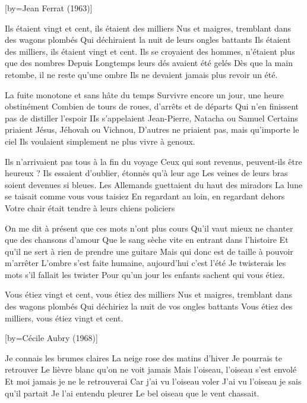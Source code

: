 [by={Jean Ferrat (1963)}]

\beginverse
Ils étaient vingt et cent, ils étaient des milliers
Nus et maigres, tremblant dans des wagons plombés
Qui déchiraient la nuit de leurs ongles battants
Ils étaient des milliers, ils étaient vingt et cent.
Ils se croyaient des hommes, n'étaient plus que des nombres
Depuis Longtemps leurs dés avaient été gelés
Dès que la main retombe, il ne reste qu'une ombre
Ils ne devaient jamais plus revoir un été.
\endverse

\beginverse
La fuite monotone et sans hâte du temps
Survivre encore un jour, une heure obstinément
Combien de tours de roues, d'arrêts et de départs
Qui n'en finissent pas de distiller l'espoir
IIs s'appelaient Jean-Pierre, Natacha ou Samuel
Certains priaient Jésus, Jéhovah ou Vichnou,
D'autres ne priaient pas, mais qu'importe le ciel
Ils voulaient simplement ne plus vivre à genoux.
\endverse

\beginverse
Ils n'arrivaient pas tous à la fin du voyage
Ceux qui sont revenus, peuvent-ils être heureux ?
Ils essaient d'oublier, étonnės qu'à leur age
Les veines de leurs bras soient devenues si bleues.
Les Allemands guettaient du haut des miradors
La lune se taisait comme vous vous taisiez
En regardant au loin, en regardant dehors
Votre chair était tendre à leurs chiens policiers
\endverse

\beginverse
On me dit à présent que ces mots n'ont plus cours
Qu'il vaut mieux ne chanter que des chansons d’amour
Que le sang sèche vite en entrant dans l'histoire
Et qu'il ne sert à rien de prendre une guitare
Mais qui donc est de taille à pouvoir m'arrêter
L'ombre s'est faite humaine, aujourd'hui c'est l'été
Je twisterais les mots s'il fallait les twister
Pour qu'un jour les enfants sachent qui vous étiez.
\endverse

\beginverse
Vous étiez vingt et cent, vous étiez des milliers
Nus et maigres, tremblant dans des wagons plombés
Qui déchiriez la nuit de vos ongles battants
Vous étiez des milliers, vous étiez vingt et cent.
\endverse

[by={Cécile Aubry (1968)}]

\beginverse
Je connais les brumes claires
La neige rose des matins d'hiver
Je pourrais te retrouver
Le lièvre blanc qu'on ne voit jamais
Mais l'oiseau, l'oiseau s'est envolé
Et moi jamais je ne le retrouverai
Car j'ai vu l'oiseau voler
J'ai vu l'oiseau je sais qu'il partait
Je l'ai entendu pleurer
Le bel oiseau que le vent chassait.
\endverse

